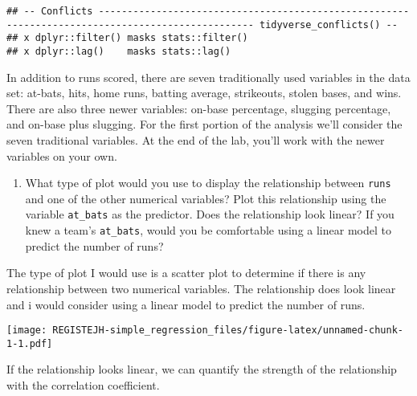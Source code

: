 \documentclass[
]{article}
\newenvironment{Shaded}{\begin{snugshade}}{\end{snugshade}}
\newcommand{\KeywordTok}[1]{\textcolor[rgb]{0.13,0.29,0.53}{\textbf{#1}}}
\newcommand{\NormalTok}[1]{#1}
\newcommand{\OperatorTok}[1]{\textcolor[rgb]{0.81,0.36,0.00}{\textbf{#1}}}
\providecommand{\tightlist}{%
  \setlength{\itemsep}{0pt}\setlength{\parskip}{0pt}}
\begin{document}
\begin{verbatim}
## -- Conflicts ------------------------------------------------------------------------------------------------- tidyverse_conflicts() --
## x dplyr::filter() masks stats::filter()
## x dplyr::lag()    masks stats::lag()
\end{verbatim}

In addition to runs scored, there are seven traditionally used variables
in the data set: at-bats, hits, home runs, batting average, strikeouts,
stolen bases, and wins. There are also three newer variables: on-base
percentage, slugging percentage, and on-base plus slugging. For the
first portion of the analysis we'll consider the seven traditional
variables. At the end of the lab, you'll work with the newer variables
on your own.

\begin{enumerate}
\def\labelenumi{\arabic{enumi}.}
\tightlist
\item
  What type of plot would you use to display the relationship between
  \texttt{runs} and one of the other numerical variables? Plot this
  relationship using the variable \texttt{at\_bats} as the predictor.
  Does the relationship look linear? If you knew a team's
  \texttt{at\_bats}, would you be comfortable using a linear model to
  predict the number of runs?
\end{enumerate}

The type of plot I would use is a scatter plot to determine if there is
any relationship between two numerical variables. The relationship does
look linear and i would consider using a linear model to predict the
number of runs.

\begin{Shaded}
\end{Shaded}

\texttt{[image: REGISTEJH-simple\_regression\_files/figure-latex/unnamed-chunk-1-1.pdf]}

If the relationship looks linear, we can quantify the strength of the
relationship with the correlation coefficient.

\begin{Shaded}
\end{Shaded}
\end{document}

